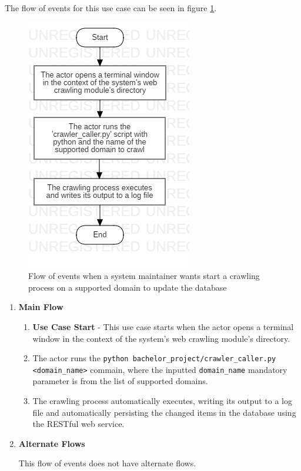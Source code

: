 \documentclass[12pt,a4paper,twoside]{report}
\begin{document}
The flow of events for this use case can be seen in figure \ref{fig:flow_crawl_update_database}.

\begin{figure}[ht]
  \centering
  \includegraphics[width=0.4\linewidth]{img/flow_crawl_update_database.png}
  \caption{Flow of events when a system maintainer wants start a crawling process on a supported domain to update the database}
  \label{fig:flow_crawl_update_database}
\end{figure}

\begin{enumerate}

\item \textbf{Main Flow}

  \begin{enumerate}
    \item \textbf{Use Case Start} - This use case starts when the actor opens a terminal window in the context of the system's web crawling module's directory.
    \item The actor runs the \lstinline$python bachelor_project/crawler_caller.py <domain_name>$ commain, where the inputted \lstinline$domain_name$ mandatory parameter is from the list of supported domains.
    \item The crawling process automatically executes, writing its output to a log file and automatically persisting the changed items in the database using the RESTful web service.
  \end{enumerate}


  \item \textbf{Alternate Flows}

  This flow of events does not have alternate flows.

\end{enumerate}
\end{document}
